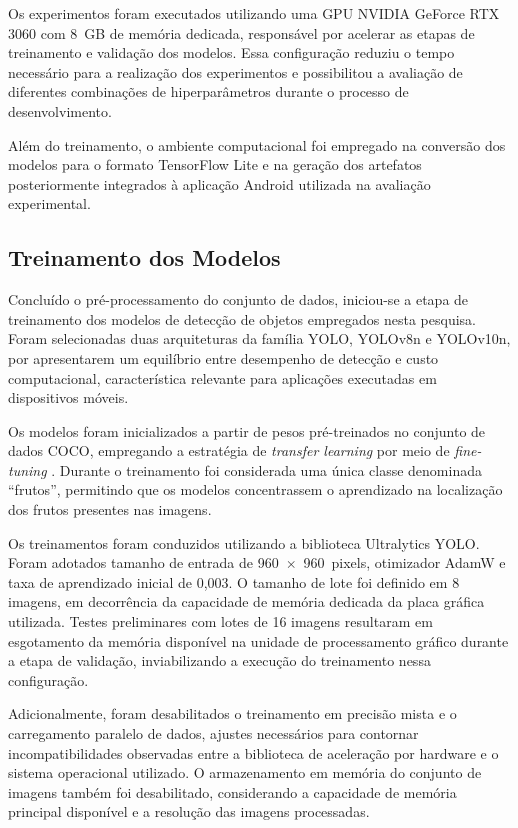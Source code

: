 \documentclass[artigo,times,capa]{iftex2024}
\begin{document}
Os experimentos foram executados utilizando uma GPU NVIDIA GeForce RTX 3060 com 8~GB de memória dedicada, responsável por acelerar as etapas de treinamento e validação dos modelos. Essa configuração reduziu o tempo necessário para a realização dos experimentos e possibilitou a avaliação de diferentes combinações de hiperparâmetros durante o processo de desenvolvimento.

Além do treinamento, o ambiente computacional foi empregado na conversão dos modelos para o formato TensorFlow Lite e na geração dos artefatos posteriormente integrados à aplicação Android utilizada na avaliação experimental.

\subsection{Treinamento dos Modelos}

Concluído o pré-processamento do conjunto de dados, iniciou-se a etapa de treinamento dos modelos de detecção de objetos empregados nesta pesquisa. Foram selecionadas duas arquiteturas da família YOLO, YOLOv8n e YOLOv10n, por apresentarem um equilíbrio entre desempenho de detecção e custo computacional, característica relevante para aplicações executadas em dispositivos móveis.

Os modelos foram inicializados a partir de pesos pré-treinados no conjunto de dados \ac{COCO}, empregando a estratégia de \textit{transfer learning} por meio de \textit{fine-tuning} \cite{Tan2018TransferLearning}. Durante o treinamento foi considerada uma única classe denominada ``frutos'', permitindo que os modelos concentrassem o aprendizado na localização dos frutos presentes nas imagens.

Os treinamentos foram conduzidos utilizando a biblioteca Ultralytics YOLO.
Foram adotados tamanho de entrada de 960~$\times$~960~pixels, otimizador
AdamW e taxa de aprendizado inicial de 0,003. O tamanho de lote foi
definido em 8 imagens, em decorrência da capacidade de memória dedicada da
placa gráfica utilizada. Testes preliminares com lotes de 16 imagens
resultaram em esgotamento da memória disponível na unidade de
processamento gráfico durante a etapa de validação, inviabilizando a
execução do treinamento nessa configuração.

Adicionalmente, foram desabilitados o treinamento em precisão mista e o
carregamento paralelo de dados, ajustes necessários para contornar
incompatibilidades observadas entre a biblioteca de aceleração por
hardware e o sistema operacional utilizado. O armazenamento em memória do
conjunto de imagens também foi desabilitado, considerando a capacidade de
memória principal disponível e a resolução das imagens processadas.
\end{document}
